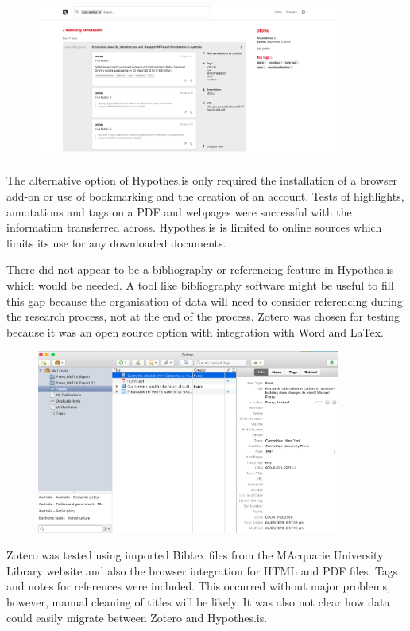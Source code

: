 \documentclass{article}
\begin{document}
\begin{figure}[htp]
    \centering
    \includegraphics[width=10cm]{Hypothesis.png}
    \label{fig:hypothesis}
\end{figure}

The alternative option of Hypothes.is only required the installation of a browser add-on or use of bookmarking and the creation of an account. Tests of highlights, annotations and tags on a PDF and webpages were successful with the information transferred across. Hypothes.is is limited to online sources which limits its use for any downloaded documents.

There did not appear to be a bibliography or referencing feature in Hypothes.is which would be needed. A tool like bibliography software might be useful to fill this gap because the organisation of data will need to consider referencing during the research process, not at the end of the process. Zotero was chosen for testing because it was an open source option with integration with Word and LaTex.

\begin{figure}[htp]
    \centering
    \includegraphics[width=10cm]{Zotero.png}
    \label{fig:zotero}
\end{figure}

Zotero was tested using imported Bibtex files from the MAcquarie University Library website and also the browser integration for HTML and PDF files. Tags and notes for references were included. This occurred without major problems, however, manual cleaning of titles will be likely. It was also not clear how data could easily migrate between Zotero and Hypothes.is.
\end{document}
